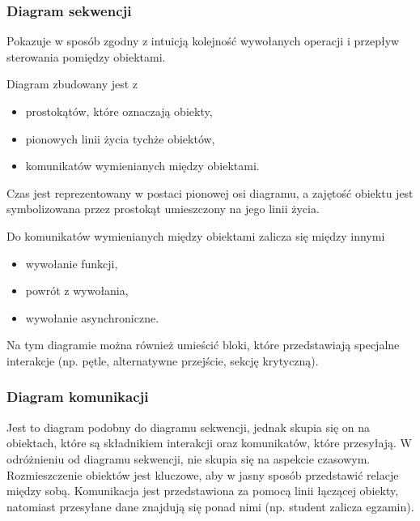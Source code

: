 \subsubsection{Diagram sekwencji}
Pokazuje w sposób zgodny z intuicją kolejność wywołanych operacji i przepływ sterowania pomiędzy obiektami.

Diagram zbudowany jest z
\begin{itemize}
	\item{prostokątów, które oznaczają obiekty,}
	\item{pionowych linii życia tychże obiektów,}
	\item{komunikatów wymienianych między obiektami.}
\end{itemize}

Czas jest reprezentowany w postaci pionowej osi diagramu, a zajętość obiektu jest symbolizowana przez prostokąt umieszczony na jego linii życia.

Do komunikatów wymienianych między obiektami zalicza się między innymi
\begin{itemize}
	\item{wywołanie funkcji,}
	\item{powrót z wywołania,}
	\item{wywołanie asynchroniczne.}
\end{itemize}

Na tym diagramie można również umieścić bloki, które przedstawiają specjalne interakcje (np. pętle, alternatywne przejście, sekcję krytyczną).

\subsubsection{Diagram komunikacji}
Jest to diagram podobny do diagramu sekwencji, jednak skupia się on na obiektach, które są składnikiem interakcji oraz komunikatów, które przesyłają. W odróżnieniu od diagramu sekwencji, nie skupia się na aspekcie czasowym. Rozmieszczenie obiektów jest kluczowe, aby w jasny sposób przedstawić relacje między sobą. Komunikacja jest przedstawiona za pomocą linii łączącej obiekty, natomiast przesyłane dane znajdują się ponad nimi (np. student zalicza egzamin).
